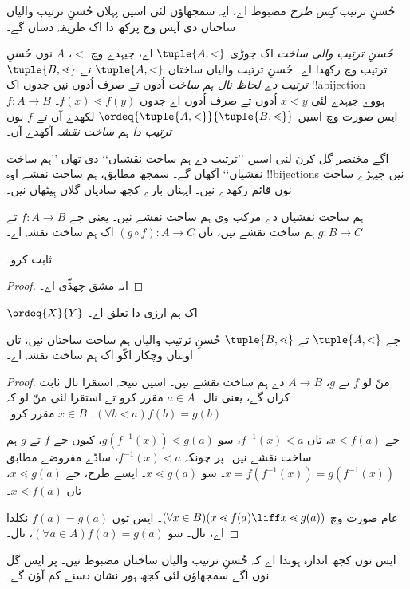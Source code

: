\documentclass[../../../include/open-logic-section]{subfiles}
\begin{document}

حُسنِ ترتیب \emph{کِس طرح} مضبوط اے، ایہ سمجھاؤن لئی اسیں پہلاں حُسنِ
ترتیب والیاں ساختاں دی آپس وچ پرکھ دا اک طریقہ دساں گے۔

\begin{defn}
\emph{حُسنِ ترتیب والی ساخت} اک جوڑی $\tuple{A, <}$ اے، جیہدے وچ $<$،
$A$ نوں حُسنِ ترتیب وچ رکھدا اے۔ حُسنِ ترتیب والیاں ساختاں $\tuple{A, <}$
تے $\tuple{B, \lessdot}$ \emph{ترتیب دے لحاظ نال ہم ساخت} اُدوں تے صرف اُدوں
نیں جدوں اک !!a{bijection} $f \colon A \to B$ ہووے جیہدے لئی
$x < y$ اُدوں تے صرف اُدوں اے جدوں $f(x) \lessdot  f(y)$۔
ایس صورت وچ اسیں $\ordeq{\tuple{A, <}}{\tuple{B, \lessdot}}$ لکھدے آں
تے $f$ نوں \emph{ترتیب دا ہم ساخت نقشہ} آکھدے آں۔
\end{defn}
\noindent
اگے مختصر گل کرن لئی اسیں ’’ترتیب دے ہم ساخت نقشیاں‘‘ دی تھاں ’’ہم ساخت
نقشیاں‘‘ آکھاں گے۔ سمجھ مطابق، ہم ساخت نقشے اوہ !!{bijection}s نیں
جیہڑے ساخت نوں قائم رکھدے نیں۔ ایہناں بارے کجھ سادیاں گلاں ہِیٹھاں نیں۔

\begin{lem}
ہم ساخت نقشیاں دے مرکب وی ہم ساخت نقشے نیں۔ یعنی جے $f \colon A \to B$
تے $g \colon B \to C$ ہم ساخت نقشے نیں، تاں $(g \circ f) \colon A \to C$
اک ہم ساخت نقشہ اے۔
\end{lem}
\begin{prob}
	 ثابت کرو۔
\end{prob}
\begin{proof}
ایہ مشق چھڈّی اے۔
\end{proof}
\begin{cor}
	$\ordeq{X}{Y}$ اک ہم ارزی دا تعلق اے۔
\end{cor}
\begin{prop}
جے $\tuple{A, <}$ تے $\tuple{B, \lessdot}$ حُسنِ ترتیب والیاں ہم ساخت
ساختاں نیں، تاں اوہناں وچکار اکّو اک ہم ساخت نقشہ اے۔
\end{prop}

\begin{proof}
منّ لو $f$ تے $g$، $A \to B$ دے ہم ساخت نقشے نیں۔ اسیں نتیجہ استقرا
نال ثابت کراں گے، یعنی  نال۔
$a\in A$ مقرر کرو تے استقرا لئی منّ لو کہ $(\forall b < a)f(b) = g(b)$۔
$x \in B$ مقرر کرو۔

جے $x \lessdot f(a)$، تاں $f^{-1}(x) < a$، سو
$g(f^{-1}(x)) \lessdot g(a)$، کیوں جے $f$ تے $g$ ہم ساخت نقشے نیں۔
پر چونکہ $f^{-1}(x) < a$، ساڈے مفروضے مطابق
$x =f(f^{-1}(x)) = g(f^{-1}(x))$۔ سو $x \lessdot g(a)$۔
ایسے طرح، جے $x \lessdot g(a)$، تاں $x \lessdot f(a)$۔

عام صورت وچ $(\forall x \in B)(x \lessdot f(a) \liff x \lessdot g(a))$۔
ایس توں $f(a) = g(a)$ نکلدا اے، 
نال۔ سو $(\forall a \in A)f(a) = g(a)$،  نال۔
\end{proof}\noindent
ایس توں کجھ اندازہ ہوندا اے کہ حُسنِ ترتیب والیاں ساختاں مضبوط نیں۔
پر ایس گل نوں اگے سمجھاؤن لئی کجھ ہور نشان دسنے کم آؤن گے۔
\end{document}
